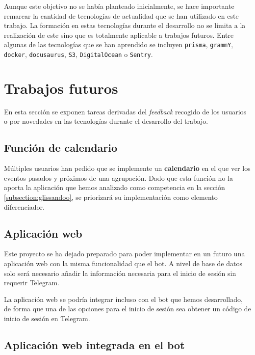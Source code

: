 Aunque este objetivo no se había planteado inicialmente, se hace importante remarcar la cantidad de tecnologías de actualidad que se han utilizado en este trabajo. La formación en estas tecnologías durante el desarrollo no se limita a la realización de este sino que es totalmente aplicable a trabajos futuros. Entre algunas de las tecnologías que se han aprendido se incluyen \texttt{prisma}, \texttt{grammY}, \texttt{docker}, \texttt{docusaurus}, \texttt{S3}, \texttt{DigitalOcean} o \texttt{Sentry}.



\section{Trabajos futuros}

En esta sección se exponen tareas derivadas del \textit{feedback} recogido de los usuarios o por novedades en las tecnologías durante el desarrollo del trabajo.

\subsection{Función de calendario}

Múltiples usuarios han pedido que se implemente un \textbf{calendario} en el que ver los eventos pasados y próximos de una agrupación. Dado que esta función no la aporta la aplicación que hemos analizado como competencia en la sección \ref{subsection:glissandoo}, se priorizará su implementación como elemento diferenciador.

\subsection{Aplicación web}

Este proyecto se ha dejado preparado para poder implementar en un futuro una aplicación web con la misma funcionalidad que el bot. A nivel de base de datos solo será necesario añadir la información necesaria para el inicio de sesión sin requerir Telegram.

La aplicación web se podría integrar incluso con el bot que hemos desarrollado, de forma que una de las opciones para el inicio de sesión sea obtener un código de inicio de sesión en Telegram.

\subsection{Aplicación web integrada en el bot}

